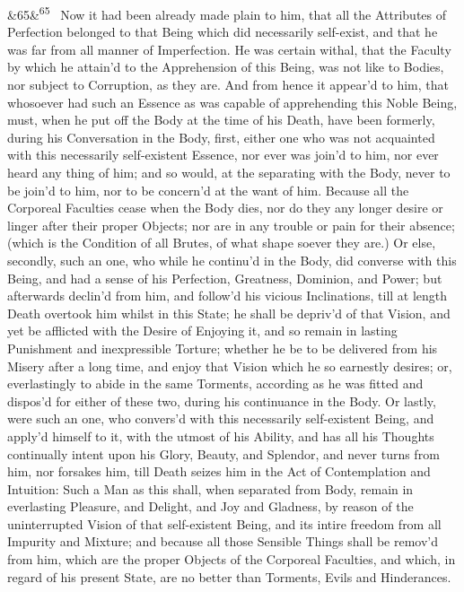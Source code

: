 \documentclass[12pt]{article}
\newcommand{\para}[1][]{\par\noindent\ifx&#1&\else\textsuperscript{\footnotesize #1}~\fi}
\begin{document}
\para[65] Now it had been already made plain to him, that all the Attributes of Perfection belonged to that Being which did necessarily self-exist, and that he was far from all manner of Imperfection. He was certain withal, that the Faculty by which he attain'd to the Apprehension of this Being, was not like to Bodies, nor subject to Corruption, as they are. And from hence it appear'd to him, that whosoever had such an Essence as was capable of apprehending this Noble Being, must, when he put off the Body at the time of his Death, have been formerly, during his Conversation in the Body, first, either one who was not acquainted with this necessarily self-existent Essence, nor ever was join'd to him, nor ever heard any thing of him; and so would, at the separating with the Body, never to be join'd to him, nor to be concern'd at the want of him. Because all the Corporeal Faculties cease when the Body dies, nor do they any longer desire or linger after their proper Objects; nor are in any trouble or pain for their absence; (which is the Condition of all Brutes, of what shape soever they are.) Or else, secondly, such an one, who while he continu'd in the Body, did converse with this Being, and had a sense of his Perfection, Greatness, Dominion, and Power; but afterwards declin'd from him, and follow'd his vicious Inclinations, till at length Death overtook him whilst in this State; he shall be depriv'd of that Vision, and yet be afflicted with the Desire of Enjoying it, and so remain in lasting Punishment and inexpressible Torture; whether he be to be delivered from his Misery after a long time, and enjoy that Vision which he so earnestly desires; or, everlastingly to abide in the same Torments, according as he was fitted and dispos'd for either of these two, during his continuance in the Body. Or lastly, were such an one, who convers'd with this necessarily self-existent Being, and apply'd himself to it, with the utmost of his Ability, and has all his Thoughts continually intent upon his Glory, Beauty, and Splendor, and never turns from him, nor forsakes him, till Death seizes him in the Act of Contemplation and Intuition: Such a Man as this shall, when separated from Body, remain in everlasting Pleasure, and Delight, and Joy and Gladness, by reason of the uninterrupted Vision of that self-existent Being, and its intire freedom from all Impurity and Mixture; and because all those Sensible Things shall be remov'd from him, which are the proper Objects of the Corporeal Faculties, and which, in regard of his present State, are no better than Torments, Evils and Hinderances.
\end{document}
